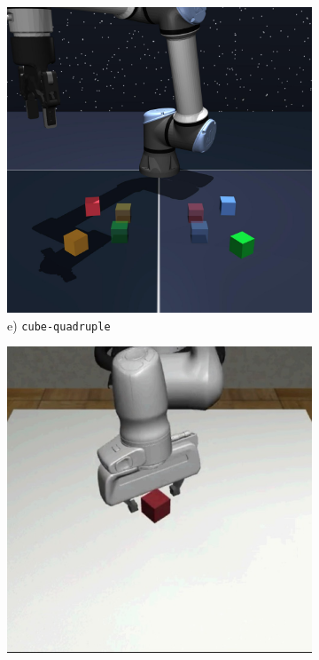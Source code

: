 \begin{figure}[t]
    \begin{minipage}{0.24\textwidth}
        \begin{subfigure}{\textwidth}
            \centering
            \includegraphics[width=0.98\linewidth]{figures/renders/cube-quadruple-play-singletask-task2-v0.jpeg}
            \caption{\footnotesize e) \texttt{cube-quadruple}}
            \label{fig:cube-quadruple-viz}
        \end{subfigure}
    \end{minipage}\hfill
    \begin{minipage}{0.24\textwidth}
        \begin{subfigure}{\textwidth}
            \centering
            \includegraphics[width=\linewidth]{figures/renders/lift.jpeg}

\end{subfigure}
\end{minipage}
\end{figure}
